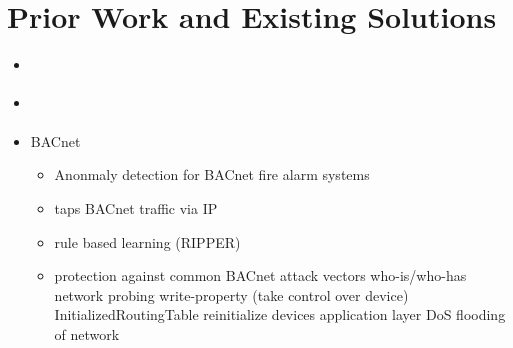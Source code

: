\section{Prior Work and Existing Solutions}
\begin{itemize}
	\item \parencite{Yang2006}
	\item \parencite{Celeda2012}
	\item \textcite{Pan2014} BACnet
		\begin{itemize}
			\item Anonmaly detection for BACnet fire alarm systems
			\item taps BACnet traffic via IP
			\item rule based learning (RIPPER)
			\item protection against common BACnet attack vectors
				\subitem who-is/who-has network probing
				\subitem write-property (take control over device)
				\subitem InitializedRoutingTable
				\subitem reinitialize devices
				\subitem application layer DoS
				\subitem flooding of network
		\end{itemize}
\end{itemize}